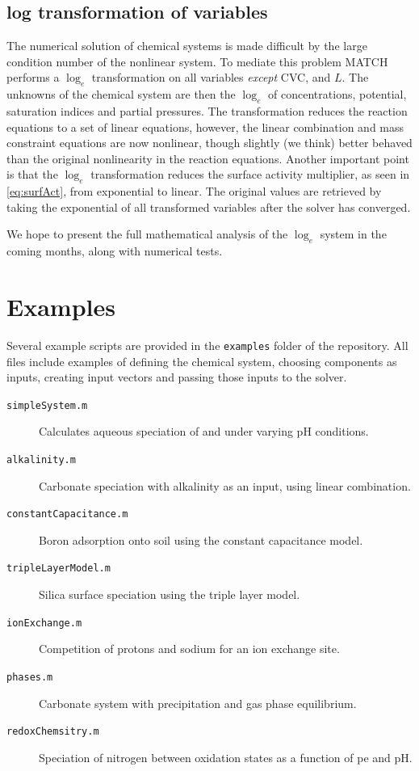 \documentclass{article}
\begin{document}
\subsection{log transformation of variables}

The numerical solution of chemical systems is made difficult by the large condition number of the nonlinear system. To mediate this problem MATCH performs a $\log_e$ transformation on all variables \emph{except} CVC, and $L$. The unknowns of the chemical system are then the $\log_e$ of concentrations, potential, saturation indices and partial pressures. The transformation reduces the reaction equations to a set of linear equations, however, the linear combination and mass constraint equations are now nonlinear, though slightly (we think) better behaved than the original nonlinearity in the reaction equations. Another important point is that the $\log_e$ transformation reduces the surface activity multiplier, as seen in \eqref{eq:surfAct}, from exponential to linear. The original values are retrieved by taking the exponential of all transformed variables after the solver has converged. 

We hope to present the full mathematical analysis of the $\log_e$ system in the coming months, along with numerical tests. 
\section{Examples}
Several example scripts are provided in the \verb|examples| folder of the repository. All files include examples of defining the chemical system, choosing components as inputs, creating input vectors and passing those inputs to the solver. 
\begin{description}
        \item[\texttt{simpleSystem.m}] Calculates aqueous speciation of  and  under varying pH conditions.
        \item[\texttt{alkalinity.m}] Carbonate speciation with alkalinity as an input, using linear combination.
        \item[\texttt{constantCapacitance.m}] Boron adsorption onto soil using the constant capacitance model.
        \item[\texttt{tripleLayerModel.m}] Silica surface speciation using the triple layer model.
        \item[\texttt{ionExchange.m}] Competition of protons and sodium for an ion exchange site.
        \item[\texttt{phases.m}] Carbonate system with precipitation and gas phase equilibrium.
        \item[\texttt{redoxChemsitry.m}] Speciation of nitrogen between oxidation states as a function of pe and pH.
\end{description}
\end{document}
